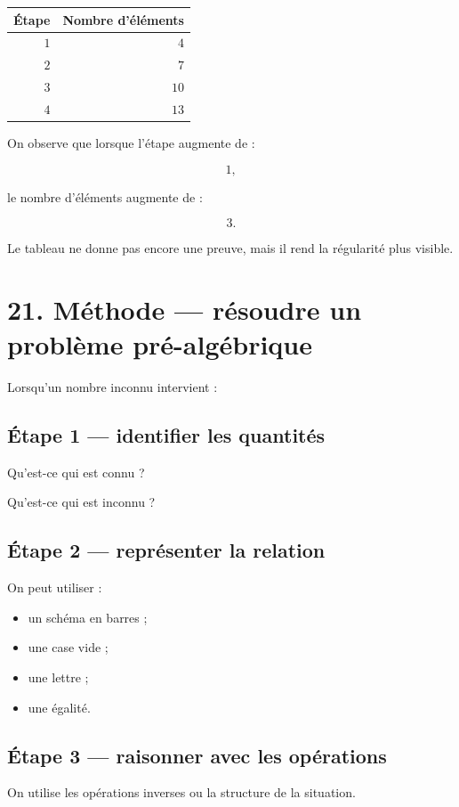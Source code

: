 \begin{tabular}{r r}
\textbf{Étape} & \textbf{Nombre d’éléments} \\
\hline
$1$ & $4$ \\
$2$ & $7$ \\
$3$ & $10$ \\
$4$ & $13$ \\
\end{tabular}

On observe que lorsque l’étape augmente de :

\[
1,
\]

le nombre d’éléments augmente de :

\[
3.
\]

Le tableau ne donne pas encore une preuve, mais il rend la régularité plus visible.

\section{21. Méthode — résoudre un problème pré-algébrique}

Lorsqu’un nombre inconnu intervient :

\subsection{Étape 1 — identifier les quantités}

Qu’est-ce qui est connu ?

Qu’est-ce qui est inconnu ?

\subsection{Étape 2 — représenter la relation}

On peut utiliser :

\begin{itemize}
\item un schéma en barres ;
\item une case vide ;
\item une lettre ;
\item une égalité.
\end{itemize}

\subsection{Étape 3 — raisonner avec les opérations}

On utilise les opérations inverses ou la structure de la situation.

